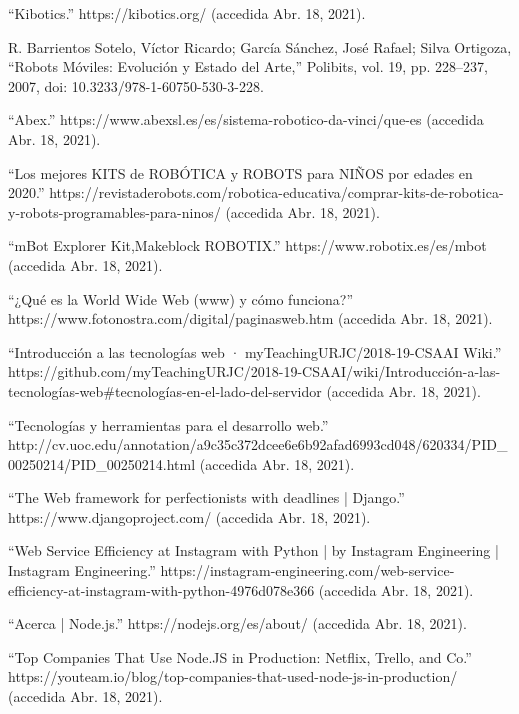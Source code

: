 \begin{thebibliography}{69}

``Kibotics.” https://kibotics.org/ (accedida  Abr. 18, 2021).

 R. Barrientos Sotelo, Víctor Ricardo; García Sánchez, José Rafael; Silva Ortigoza, ``Robots Móviles: Evolución y Estado del Arte,” Polibits, vol. 19, pp. 228–237, 2007, doi: 10.3233/978-1-60750-530-3-228.

 ``Abex.” https://www.abexsl.es/es/sistema-robotico-da-vinci/que-es (accedida Abr. 18, 2021).

 ``Los mejores KITS de ROBÓTICA y ROBOTS para NIÑOS por edades en 2020.” https://revistaderobots.com/robotica-educativa/comprar-kits-de-robotica-y-robots-programables-para-ninos/ (accedida Abr. 18, 2021).

	``mBot Explorer Kit,Makeblock ROBOTIX.” https://www.robotix.es/es/mbot (accedida Abr. 18, 2021).

	``¿Qué es la World Wide Web (www) y cómo funciona?” https://www.fotonostra.com/digital/paginasweb.htm (accedida Abr. 18, 2021).

 ``Introducción a las tecnologías web · myTeachingURJC/2018-19-CSAAI Wiki.” https://github.com/myTeachingURJC/2018-19-CSAAI/wiki/Introducción-a-las-tecnologías-web\#tecnologías-en-el-lado-del-servidor (accedida Abr. 18, 2021).


	``Tecnologías y herramientas para el desarrollo web.” http://cv.uoc.edu/annotation/a9c35c372dcee6e6b92afad6993cd048/620334/PID\_00250214/PID\_00250214.html (accedida Abr. 18, 2021).


``The Web framework for perfectionists with deadlines | Django.” https://www.djangoproject.com/ (accedida Abr. 18, 2021).

	``Web Service Efficiency at Instagram with Python | by Instagram Engineering | Instagram Engineering.” https://instagram-engineering.com/web-service-efficiency-at-instagram-with-python-4976d078e366  (accedida Abr. 18, 2021).

	``Acerca | Node.js.” https://nodejs.org/es/about/ (accedida Abr. 18, 2021).

 ``Top Companies That Use Node.JS in Production: Netflix, Trello, and Co.” https://youteam.io/blog/top-companies-that-used-node-js-in-production/ (accedida Abr. 18, 2021).



\end{thebibliography}
